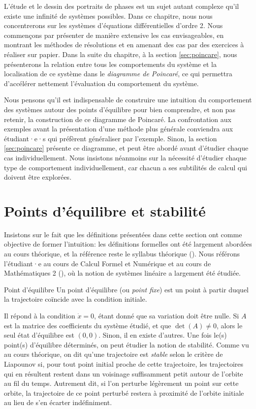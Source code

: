         L'étude et le dessin des portraits de phases est un sujet autant complexe qu'il existe une infinité de systèmes possibles. Dans ce chapitre, nous nous concentrerons sur les systèmes d'équations différentielles d'ordre 2. Nous commençons par présenter de manière extensive les cas envisageables, en montrant les méthodes de résolutions et en amenant des cas par des exercices à réaliser sur papier. Dans la suite du chapitre, à la section \ref{sec:poincare}, nous présenterons la relation entre tous les comportements du système et la localisation de ce système dans le \textit{diagramme de Poincaré}, ce qui permettra d'accélérer nettement l'évaluation du comportement du système. 

        Nous pensons qu'il est indispensable de construire une intuition du comportement des systèmes autour des points d'équilibre pour bien comprendre, et non pas retenir, la construction de ce diagramme de Poincaré. La confrontation aux exemples avant la présentation d'une méthode plus générale conviendra aux étudiant·e·s qui préfèrent généraliser par l'exemple. Sinon, la section \ref{sec:poincare} présente ce diagramme, et peut être abordé avant d'étudier chaque cas individuellement. Nous insistons néanmoins sur la nécessité d'étudier chaque type de comportement individuellement, car chacun a ses subtilités de calcul qui doivent être explorées.
    
    \section{Points d'équilibre et stabilité}
        Insistons sur le fait que les définitions présentées dans cette section ont comme objective de former l'intuition: les définitions formelles ont été largement abordées au cours théorique, et la référence reste le syllabus théorique (\cite{infof305}). Nous référons l'étudiant·e au cours de Calcul Formel et Numérique et au cours de Mathématiques 2 (\cite{infof205}), où la notion de systèmes linéaire a largement été étudiée.
        \begin{definition}{Point d'équilibre}
            Un point d'équilibre (ou \textit{point fixe}) est un point à partir duquel la trajectoire coïncide avec la condition initiale.
        \end{definition}
         Il répond à la condition $\dot{x} = 0$, étant donné que sa variation doit être nulle. Si $A$ est la matrice des coefficients du système étudié, et que $\det(A) \neq 0$, alors le seul état d'équilibre est $(0, 0)$. Sinon, il en existe d'autres.
         Une fois le(s) point(s) d'équilibre déterminés, on peut étudier la notion de stabilité. Comme vu au cours théorique, on dit qu'une trajectoire est \textit{stable} selon le critère de Liapounov si, pour tout point initial proche de cette trajectoire, les trajectoires qui en résultent restent dans un voisinage suffisamment petit autour de l'orbite au fil du temps. Autrement dit, si l'on perturbe légèrement un point sur cette orbite, la trajectoire de ce point perturbé restera à proximité de l'orbite initiale au lieu de s'en écarter indéfiniment. 

